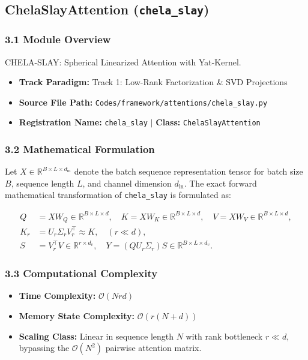 \subsection{ChelaSlayAttention (\texttt{chela\_slay})}
\label{sec:app_module_chela_slay}

\subsubsection*{3.1 Module Overview}
CHELA-SLAY: Spherical Linearized Attention with Yat-Kernel.
\begin{itemize}
    \item \textbf{Track Paradigm:} Track 1: Low-Rank Factorization \& SVD Projections
    \item \textbf{Source File Path:} \texttt{Codes/framework/attentions/chela\_slay.py}
    \item \textbf{Registration Name:} \texttt{chela\_slay} $\mid$ \textbf{Class:} \texttt{ChelaSlayAttention}
\end{itemize}

\subsubsection*{3.2 Mathematical Formulation}
Let $X \in \mathbb{R}^{B \times L \times d_{\text{in}}}$ denote the batch sequence representation tensor for batch size $B$, sequence length $L$, and channel dimension $d_{\text{in}}$. The exact forward mathematical transformation of \texttt{chela\_slay} is formulated as:

\begin{align}
Q &= X W_Q \in \mathbb{R}^{B \times L \times d}, \quad K = X W_K \in \mathbb{R}^{B \times L \times d}, \quad V = X W_V \in \mathbb{R}^{B \times L \times d}, \\
K_r &= U_r \Sigma_r V_r^\top \approx K, \quad (r \ll d), \\
S &= V_r^\top V \in \mathbb{R}^{r \times d_v}, \quad Y = (Q U_r \Sigma_r) S \in \mathbb{R}^{B \times L \times d_v}.
\end{align}


\subsubsection*{3.3 Computational Complexity}
\begin{itemize}
    \item \textbf{Time Complexity:} $\mathcal{O}(N r d)$
    \item \textbf{Memory State Complexity:} $\mathcal{O}(r(N + d))$
    \item \textbf{Scaling Class:} Linear in sequence length $N$ with rank bottleneck $r \ll d$, bypassing the $\mathcal{O}(N^2)$ pairwise attention matrix.
\end{itemize}

